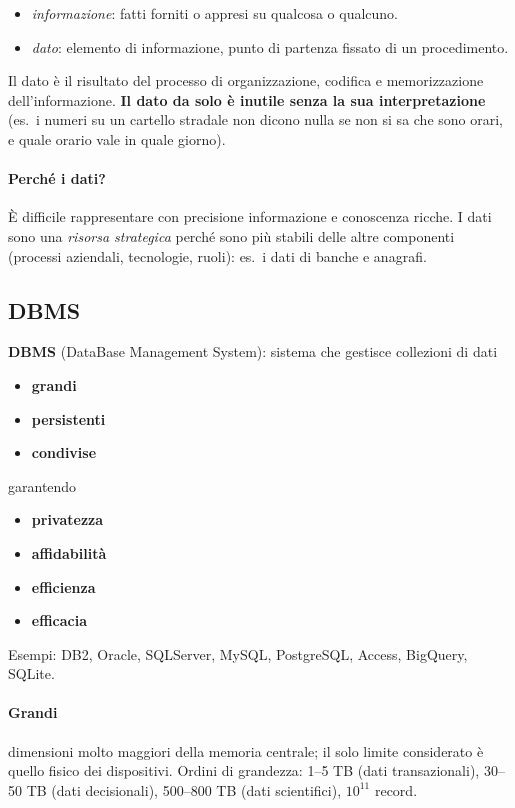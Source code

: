 \documentclass[a4paper,12pt]{article}
\begin{document}
\begin{itemize}
  \item \emph{informazione}: fatti forniti o appresi su qualcosa o qualcuno.
  \item \emph{dato}: elemento di informazione, punto di partenza fissato di un
    procedimento.
\end{itemize}

Il dato è il risultato del processo di organizzazione, codifica e memorizzazione
dell'informazione. \textbf{Il dato da solo è inutile senza la sua
interpretazione} (es.\ i numeri su un cartello stradale non dicono nulla se non
si sa che sono orari, e quale orario vale in quale giorno).

\paragraph{Perché i dati?} È difficile rappresentare con precisione informazione
e conoscenza ricche. I dati sono una \emph{risorsa strategica} perché sono più
stabili delle altre componenti (processi aziendali, tecnologie, ruoli): es.\ i
dati di banche e anagrafi.

\subsection{DBMS}

\textbf{DBMS} (DataBase Management System): sistema che gestisce collezioni di
dati
\begin{itemize}
  \item \textbf{grandi}
  \item \textbf{persistenti}
  \item \textbf{condivise}
\end{itemize}
garantendo
\begin{itemize}
  \item \textbf{privatezza}
  \item \textbf{affidabilità}
  \item \textbf{efficienza}
  \item \textbf{efficacia}
\end{itemize}

Esempi: DB2, Oracle, SQLServer, MySQL, PostgreSQL, Access, BigQuery, SQLite.

\paragraph{Grandi} dimensioni molto maggiori della memoria centrale; il solo
limite considerato è quello fisico dei dispositivi. Ordini di grandezza: 1--5 TB
(dati transazionali), 30--50 TB (dati decisionali), 500--800 TB (dati
scientifici), $10^{11}$ record.
\end{document}
